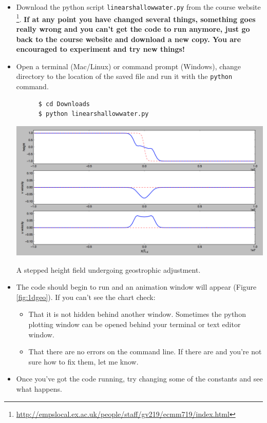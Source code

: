 \documentclass[a4paper, sfsidenotes, twoside]{tufte-handout}
\begin{document}
  \begin{itemize}
    \item Download the python script \texttt{linearshallowwater.py} from the
    course website \footnote{\url{http://empslocal.ex.ac.uk/people/staff/gv219/ecmm719/index.html}}.
    \textbf{If at any point you have changed several things, something goes really wrong and you can't get the code to run anymore, just go back to the course website and download a new copy.  You are encouraged to experiment and try new things!}
    \item Open a terminal (Mac/Linux) or command prompt (Windows), change directory to the location of the saved file and run it with the \texttt{python} command.
    \begin{verbatim}
      $ cd Downloads
      $ python linearshallowwater.py
    \end{verbatim}
    \begin{marginfigure}
      \includegraphics{geostrophy}
      \caption{A stepped height field undergoing geostrophic adjustment.}
      \label{fig:1dgeo}
    \end{marginfigure}
    \item The code should begin to run and an animation window will appear (Figure \ref{fig:1dgeo}).  If you can't see the chart check:
    \begin{itemize}
      \item That it is not hidden behind another window.  Sometimes the python plotting window can be opened behind your terminal or text editor window.
      \item That there are no errors on the command line.  If there are and you're not sure how to fix them, let me know.
    \end{itemize}
    \item Once you've got the code running, try changing some of the constants and see what happens.

\end{itemize}
\end{document}
